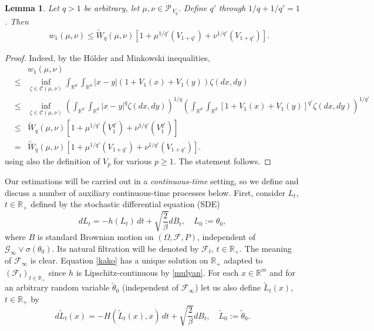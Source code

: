 \documentclass[a4paper,draft]{article}
\newtheorem{lemma}[theorem]{Lemma}
\begin{document}
\begin{lemma}\label{mr} Let $q>1$ be arbitrary, let
$\mu,\nu\in\mathcal{P}_{\, V_q}$. Define $q'$ through $1/q+1/q'=1$.
Then 
\begin{eqnarray*}
& & w_1(\mu,\nu)
\leq \tilde{W}_{q}(\mu,\nu)[1+\mu^{1/q'}(V_{1+q'})+\nu^{1/q'}(V_{1+q'})].  
\end{eqnarray*}
\end{lemma}
\begin{proof}
Indeed, by the H\"older and Minkowski inequalities,
\begin{eqnarray*}
& & w_1(\mu,\nu)\\
&\leq & \inf_{\zeta\in\mathcal{C}(\mu,\nu)}\int_{\mathbb{R}^d}\int_{\mathbb{R}^d} 
|x-y|(1+V_1(x)+V_1(y))\zeta(dx,dy)\\
&\leq & \inf_{\zeta\in\mathcal{C}(\mu,\nu)}\left(\int_{\mathbb{R}^d}\int_{\mathbb{R}^d} |x-y|^{q}\zeta(dx,dy)\right)^{1/q}
\left(\int_{\mathbb{R}^d}\int_{\mathbb{R}^d} [1+V_1(x)+V_1(y)]^{q'}\zeta(dx,dy)\right)^{1/q'}\\
&\leq& \tilde{W}_{q}(\mu,\nu)[1+\mu^{1/q'}(V^{q'}_{1})+\nu^{1/q'}(V^{q'}_{1})]\\
&=& \tilde{W}_{q}(\mu,\nu)[1+\mu^{1/q'}(V_{1+q'})+\nu^{1/q'}(V_{1+q'})].  
\end{eqnarray*}
using also the definition of $V_p$ for various $p\geq 1$. The statement follows.
\end{proof}



Our estimations will be carried out in a \emph{continuous-time} setting, so
we define and discuss a number of auxiliary {continuous-time} processes below.
First, consider $L_t$, $t\in\mathbb{R}_+$ defined by
the stochastic differential equation (SDE)
\begin{equation}\label{kako}
dL_t=-h(L_t)\, dt+ \sqrt{\frac{2}{\beta}} dB_t,\quad L_0:=\theta_0,
\end{equation}
where $B$ is standard Brownian motion on $(\Omega,\mathcal{F},P)$,
independent of $\mathcal{G}_{\infty}\vee \sigma(\theta_0)$. Its natural filtration
will be denoted by $\mathcal{F}_t$, $t\in\mathbb{R}_+$. The meaning of $\mathcal{F}_{\infty}$
is clear. Equation \eqref{kako}
has a unique solution on $\mathbb{R}_+$ adapted to $(\mathcal{F}_t)_{t\in\mathbb{R}_+}$ since $h$ is
Lipschitz-continuous by \eqref{mulyan}. For each $x\in\mathbb{R}^m$ and for
an arbitrary random variable $\tilde{\theta}_0$ (independent of $\mathcal{F}_{\infty}$)
let us also define $\tilde{L}_t(x)$, $t\in\mathbb{R}_+$ by
\begin{equation*}
d\tilde{L}_t(x)=-H(\tilde{L}_t(x),x)\, dt+ \sqrt{\frac{2}{\beta}} dB_t,\quad \tilde{L}_0:=\tilde{\theta}_0.
\end{equation*}
\end{document}
